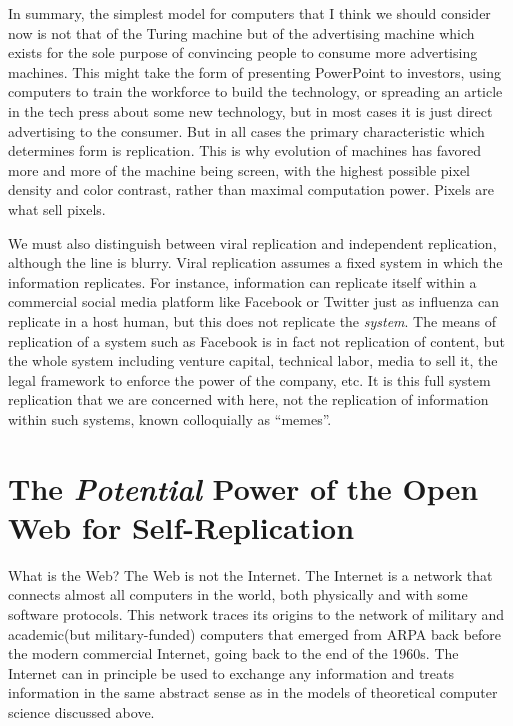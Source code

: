 \documentclass[12pt,a4paper]{amsart}
\numberwithin{equation}{section}
\begin{document}
In summary, the simplest model for computers that I think we should
consider now is not that of the Turing machine but of the advertising
machine which exists for the sole purpose of convincing people to
consume more advertising machines. This might take the form of
presenting PowerPoint to investors, using computers to train the
workforce to build the technology, or spreading an article in the tech
press about some new technology, but in most cases it is just direct
advertising to the consumer. But in all cases the primary characteristic
which determines form is replication. This is why evolution of machines
has favored more and more of the machine being screen, with the highest
possible pixel density and color contrast, rather than maximal
computation power. Pixels are what sell pixels.

We must also distinguish between viral replication and independent
replication, although the line is blurry. Viral replication assumes a
fixed system in which the information replicates. For instance,
information can replicate itself within a commercial social media
platform like Facebook or Twitter just as influenza can replicate in a
host human, but this does not replicate the \emph{system}. The means of
replication of a system such as Facebook is in fact not replication of
content, but the whole system including venture capital, technical
labor, media to sell it, the legal framework to enforce the power of the
company, etc. It is this full system replication that we are concerned
with here, not the replication of information within such systems, known
colloquially as ``memes''.

\section{\texorpdfstring{The \emph{Potential} Power of the Open
Web for
Self-Replication}{3. The Potential Power of the Open Web for Self-Replication}}\label{the-potential-power-of-the-open-web-for-self-replication}

What is the Web? The Web is not the Internet. The Internet is a network
that connects almost all computers in the world, both physically and
with some software protocols. This network traces its origins to the
network of military and academic(but military-funded) computers that
emerged from ARPA back before the modern commercial Internet, going back
to the end of the 1960s. The Internet can in principle be used to
exchange any information and treats information in the same abstract
sense as in the models of theoretical computer science discussed above.
\end{document}

